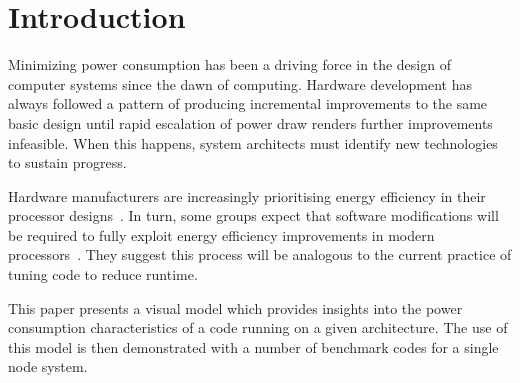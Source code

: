 \section{Introduction}

Minimizing power consumption has been a driving force in the design of computer systems since the dawn of computing.
Hardware development has always followed a pattern of producing incremental improvements to the same basic design until rapid escalation of power draw renders further improvements infeasible.
When this happens, system architects must identify new technologies to sustain progress.

Hardware manufacturers are increasingly prioritising energy efficiency in their processor designs~\cite{kurd:2014aa}.
In turn, some groups expect that software modifications will be required to fully exploit energy efficiency improvements in modern processors~\cite{shao:2013aa}.
They suggest this process will be analogous to the current practice of tuning code to reduce runtime.

This paper presents a visual model which provides insights into the  power consumption characteristics of a code running on a given architecture.
The use of this model is then demonstrated with a number of benchmark codes for a single node system.
